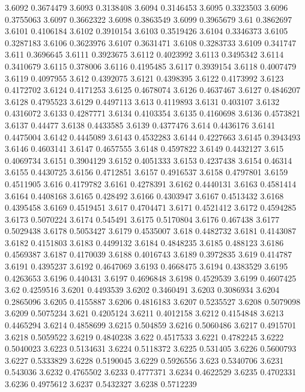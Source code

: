 3.6092  0.3674479
3.6093  0.3138408
3.6094  0.3146453
3.6095  0.3323503
3.6096  0.3755063
3.6097  0.3662322
3.6098  0.3863549
3.6099  0.3965679
3.61  0.3862697
3.6101  0.4106184
3.6102  0.3910154
3.6103  0.3519426
3.6104  0.3346373
3.6105  0.3287183
3.6106  0.3623976
3.6107  0.3631471
3.6108  0.3283733
3.6109  0.341747
3.611  0.3696645
3.6111  0.3923675
3.6112  0.4023992
3.6113  0.3495342
3.6114  0.3410679
3.6115  0.378006
3.6116  0.4195485
3.6117  0.3939154
3.6118  0.4007479
3.6119  0.4097955
3.612  0.4392075
3.6121  0.4398395
3.6122  0.4173992
3.6123  0.4172702
3.6124  0.4171253
3.6125  0.4678074
3.6126  0.4637467
3.6127  0.4846207
3.6128  0.4795523
3.6129  0.4497113
3.613  0.4119893
3.6131  0.403107
3.6132  0.4316072
3.6133  0.4287771
3.6134  0.4103354
3.6135  0.4160698
3.6136  0.4573821
3.6137  0.44477
3.6138  0.4433585
3.6139  0.4377476
3.614  0.4436176
3.6141  0.4475004
3.6142  0.4445089
3.6143  0.4532283
3.6144  0.4227663
3.6145  0.3943493
3.6146  0.4603141
3.6147  0.4657555
3.6148  0.4597822
3.6149  0.4432127
3.615  0.4069734
3.6151  0.3904129
3.6152  0.4051333
3.6153  0.4237438
3.6154  0.46314
3.6155  0.4430725
3.6156  0.4712851
3.6157  0.4916537
3.6158  0.4797801
3.6159  0.4511905
3.616  0.4179782
3.6161  0.4278391
3.6162  0.4440131
3.6163  0.4581414
3.6164  0.4408168
3.6165  0.428492
3.6166  0.4303947
3.6167  0.4513432
3.6168  0.4395458
3.6169  0.4519451
3.617  0.4704471
3.6171  0.4521412
3.6172  0.4594285
3.6173  0.5070224
3.6174  0.545491
3.6175  0.5170804
3.6176  0.467438
3.6177  0.5029438
3.6178  0.5053427
3.6179  0.4535007
3.618  0.4482732
3.6181  0.4143087
3.6182  0.4151803
3.6183  0.4499132
3.6184  0.4848235
3.6185  0.488123
3.6186  0.4569387
3.6187  0.4170039
3.6188  0.4016743
3.6189  0.3972835
3.619  0.414787
3.6191  0.4395237
3.6192  0.4647069
3.6193  0.4668475
3.6194  0.4383529
3.6195  0.4263653
3.6196  0.440431
3.6197  0.4696848
3.6198  0.4529539
3.6199  0.4607425
3.62  0.4259516
3.6201  0.4493539
3.6202  0.3460491
3.6203  0.3086934
3.6204  0.2865096
3.6205  0.4155887
3.6206  0.4816183
3.6207  0.5235527
3.6208  0.5079098
3.6209  0.5075234
3.621  0.4205124
3.6211  0.4012158
3.6212  0.4154848
3.6213  0.4465294
3.6214  0.4858699
3.6215  0.504859
3.6216  0.5060486
3.6217  0.4915701
3.6218  0.5059522
3.6219  0.4840238
3.622  0.4517533
3.6221  0.4782245
3.6222  0.5040023
3.6223  0.5134631
3.6224  0.5118372
3.6225  0.531405
3.6226  0.5600793
3.6227  0.5333829
3.6228  0.5190045
3.6229  0.5926556
3.623  0.5340706
3.6231  0.543036
3.6232  0.4765502
3.6233  0.4777371
3.6234  0.4622529
3.6235  0.4702331
3.6236  0.4975612
3.6237  0.5432327
3.6238  0.5712239
